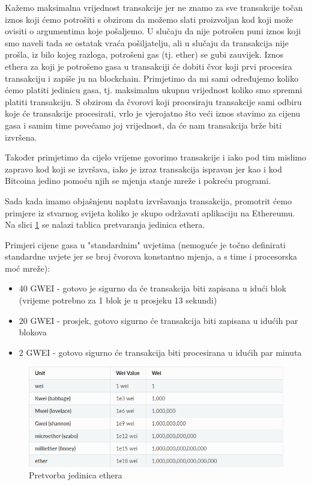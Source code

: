 \documentclass[a4paper,oneside,12pt]{memoir} %
\begin{document}
Kažemo maksimalna vrijednost transakcije jer ne znamo za sve transakcije točan iznos koji ćemo potrošiti s obzirom da možemo slati proizvoljan kod koji može ovisiti o argumentima koje pošaljemo. U slučaju da nije potrošen puni iznos koji smo naveli tada se ostatak vraća pošiljatelju, ali u slučaju da transakcija nije prošla, iz bilo kojeg razloga, potrošeni gas (tj. ether) se gubi zauvijek. Iznos ethera za koji je potrošeno gasa u transakciji će dobiti čvor koji prvi procesira transakciju i zapiše ju na blockchain. Primjetimo da mi sami određujemo koliko ćemo platiti jedinicu gasa, tj. maksimalnu ukupnu vrijednost koliko smo spremni platiti transakciju. S obzirom da čvorovi koji procesiraju transakcije sami odbiru koje će transakcije procesirati, vrlo je vjerojatno što veći iznos stavimo za cijenu gasa i samim time povećamo joj vrijednost, da će nam transakcija brže biti izvršena.

Također primjetimo da cijelo vrijeme govorimo transakcije i iako pod tim mislimo zapravo kod koji se izvršava, iako je izraz transakcija ispravan jer kao i kod Bitcoina jedino pomoću njih se mjenja stanje mreže i pokreću programi.

Sada kada imamo objašnjenu naplatu izvršavanja transakcija, promotrit ćemo primjere iz stvarnog svijeta koliko je skupo održavati aplikaciju na Ethereumu. Na slici \ref{fig:ethunits} se nalazi tablica pretvaranja jedinica ethera.

Primjeri cijene gasa u "standardnim" uvjetima (nemoguće je točno definirati standardne uvjete jer se broj čvorova konstantno mjenja, a s time i procesorska moć mreže): 
\begin{itemize}
    \item 40 GWEI - gotovo je sigurno da će transakcija biti zapisana u idući blok (vrijeme potrebno za 1 blok je u prosjeku 13 sekundi)
    \item 20 GWEI - prosjek, gotovo sigurno će transakcija biti zapisana u idućih par blokova
    \item 2 GWEI - gotovo sigurno će transakcija biti procesirana u idućih par minuta
\end{itemize}

\begin{figure}[H]
\centering
\includegraphics[scale=0.55]{ether_units}
\caption{Pretvorba jedinica ethera}
\label{fig:ethunits}
\end{figure}
\end{document}
